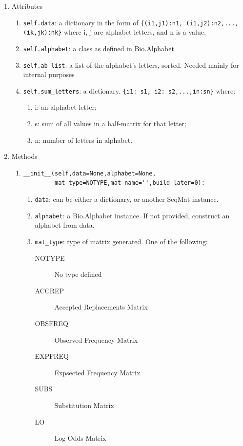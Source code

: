\documentclass{report}
\begin{document}
\begin{enumerate}
  \item Attributes

  \begin{enumerate}
    \item \verb|self.data|: a dictionary in the form of \verb|{(i1,j1):n1, (i1,j2):n2,...,(ik,jk):nk}| where i, j are alphabet letters, and n is a value.

    \item \verb|self.alphabet|: a class as defined in Bio.Alphabet

    \item \verb|self.ab_list|: a list of the alphabet's letters, sorted. Needed mainly for internal purposes

    \item \verb|self.sum_letters|: a dictionary. \verb|{i1: s1, i2: s2,...,in:sn}| where:
    \begin{enumerate}
      \item i: an alphabet letter;
      \item s: sum of all values in a half-matrix for that letter;
      \item n: number of letters in alphabet.
    \end{enumerate}
  \end{enumerate}

  \item Methods

  \begin{enumerate}

    \item
\begin{verbatim}
__init__(self,data=None,alphabet=None,
         mat_type=NOTYPE,mat_name='',build_later=0):
\end{verbatim}

    \begin{enumerate}

      \item \verb|data|: can be either a dictionary, or another SeqMat instance.
      \item \verb|alphabet|: a Bio.Alphabet instance. If not provided, construct an alphabet from data.

      \item \verb|mat_type|: type of matrix generated. One of the following:

      \begin{description}
        \item[NOTYPE]     No type defined
        \item[ACCREP]     Accepted Replacements Matrix
        \item[OBSFREQ]    Observed Frequency Matrix
        \item[EXPFREQ]    Expsected Frequency Matrix
        \item[SUBS]       Substitution Matrix      
        \item[LO]         Log Odds Matrix
      \end{description}


\end{enumerate}
\end{enumerate}
\end{enumerate}
\end{document}
